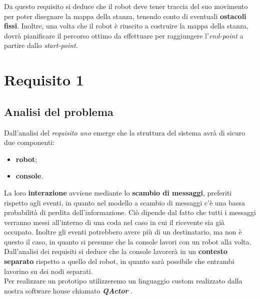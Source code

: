 \documentclass{llncs}
\newcommand{\qa}{\textsf{\textit{QActor }}}
\begin{document}
Da questo requisito si deduce che il robot deve tener traccia del suo movimento per poter disegnare la mappa della stanza, tenendo conto di eventuali \textbf{ostacoli fissi}. Inoltre, una volta che il robot \`e riuscito a costruire la mappa della stanza, dovr\`a pianificare il percorso ottimo da effettuare per raggiungere l'\textit{end-point} a partire dallo \textit{start-point}.
\pagebreak



\section{Requisito 1}
\label{Req1}
\subsection{Analisi del problema}
\label{AnalisidelproblemaReq1}

Dall'analisi del \textit{requisito uno} emerge che la struttura del sistema avr\`a di sicuro due componenti:
\begin{itemize}
    \item \textbf{robot};
    \item \textbf{console}.
\end{itemize}
La loro \textbf{interazione} avviene mediante lo \textbf{scambio di messaggi}, preferiti rispetto agli eventi, in quanto nel modello a scambio di messaggi c'\`e una bassa probabilit\`a di perdita dell'informazione. Ci\`o dipende dal fatto che tutti i messaggi verranno messi all'interno di una coda nel caso in cui il ricevente sia gi\`a occupato. Inoltre gli eventi potrebbero avere pi\`u di un destinatario, ma non \`e questo il caso, in quanto si presume che la console lavori con un robot alla volta.\\
Dall'analisi dei requisiti si deduce che la console lavorer\`a in un \textbf{contesto separato} rispetto a quello del robot, in quanto sar\`a possibile che entrambi lavorino su dei nodi separati.\\
Per realizzare un prototipo utilizzeremo un linguaggio custom realizzato dalla nostra software house chiamato \textbf{\qa}.


\end{document}

